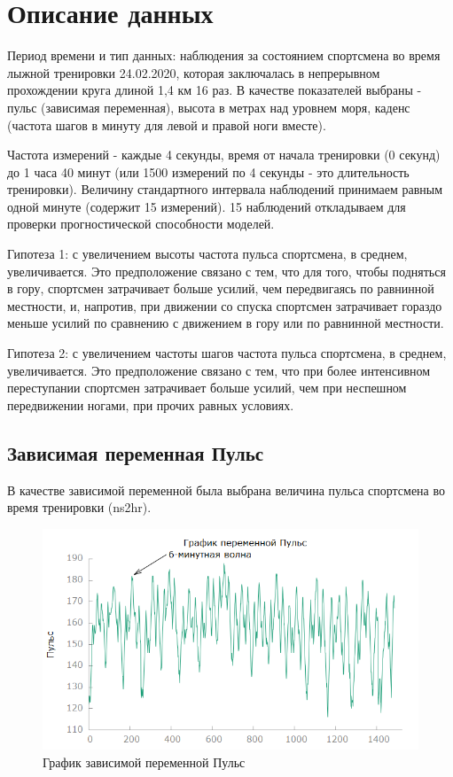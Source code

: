 \documentclass[a4paper,12pt]{article}
\begin{document}

\tableofcontents
\pagebreak

\section{Описание данных}
Период времени и тип данных: наблюдения за состоянием спортсмена во время лыжной тренировки 24.02.2020, которая заключалась в непрерывном прохождении круга длиной 1,4 км 16 раз. В качестве показателей выбраны - пульс (зависимая переменная), высота в метрах над уровнем моря, каденс (частота шагов в минуту для левой и правой ноги вместе).

Частота измерений - каждые 4 секунды, время от начала тренировки (0 секунд) до 1 часа 40 минут (или 1500 измерений по 4 секунды - это длительность тренировки). Величину стандартного интервала наблюдений принимаем равным одной минуте (содержит 15 измерений). 15 наблюдений откладываем для проверки прогностической способности моделей.

Гипотеза 1: с увеличением высоты частота пульса спортсмена, в среднем, увеличивается. Это предположение связано с тем, что для того, чтобы подняться в гору, спортсмен затрачивает больше усилий, чем передвигаясь по равнинной местности, и, напротив, при движении со спуска спортсмен затрачивает гораздо меньше усилий по сравнению с движением в гору или по равнинной местности.

Гипотеза 2: с увеличением частоты шагов частота пульса спортсмена, в среднем, увеличивается. Это предположение связано с тем, что при более интенсивном переступании спортсмен затрачивает больше усилий, чем при неспешном передвижении ногами, при прочих равных условиях.

\subsection{Зависимая переменная Пульс}

В качестве зависимой переменной была выбрана величина пульса спортсмена во время тренировки (ns2hr).

\begin{figure}[H]
	\centering
	\includegraphics[width=0.5\linewidth]{../[graphics]/hr_graph}
	\caption{График зависимой переменной Пульс}
	\label{fig:hr_graph}
\end{figure}
\end{document}

